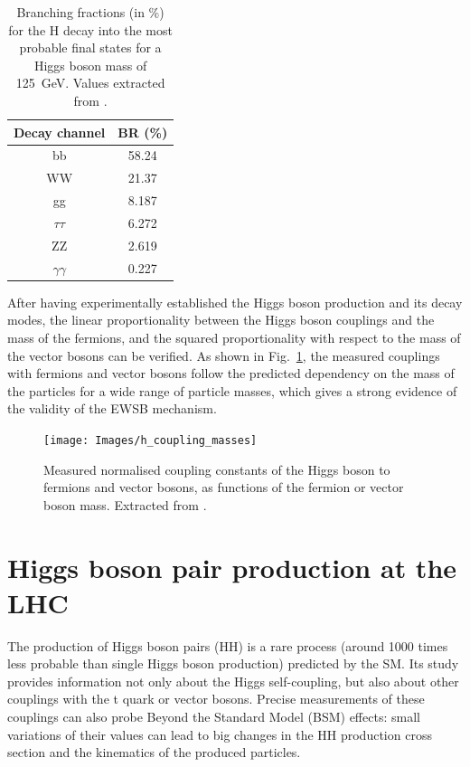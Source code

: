 \documentclass[../main.tex]{subfiles}
\begin{document}
\begin{table}[h!]
\begin{center}
\begin{tabular}{c | c}
Decay channel & BR (\%) \\\hline
bb & 58.24 \\
WW & 21.37 \\
gg & 8.187 \\
$\tau\tau$ & 6.272 \\
ZZ & 2.619 \\
$\gamma\gamma$ & 0.227
\end{tabular}
\caption{Branching fractions (in \%) for the H decay into the most probable final states for a Higgs boson mass of 125~GeV. Values extracted from \cite{intro:theo:yellow_higgs}.}
\label{theo:tab:h_br}
\end{center}
\end{table}

After having experimentally established the Higgs boson production and its decay modes, the linear proportionality between the Higgs boson couplings and the mass of the fermions, and the squared proportionality with respect to the mass of the vector bosons can be verified. As shown in Fig.~\ref{theo:fig:h_coupling_masses}, the measured couplings with fermions and vector bosons follow the predicted dependency on the mass of the particles for a wide range of particle masses, which gives a strong evidence of the validity of the EWSB mechanism.

\begin{figure}[h!]
\begin{center}
\texttt{[image: Images/h\_coupling\_masses]}
\end{center}
\caption{Measured normalised coupling constants of the Higgs boson to fermions and vector bosons, as functions of the fermion or vector boson mass. Extracted from \cite{hh:analysis:nature}.}
\label{theo:fig:h_coupling_masses}
\end{figure}

\section{Higgs boson pair production at the LHC}
\label{theo:sec:hh}

The production of Higgs boson pairs (HH) is a rare process (around 1000 times less probable than single Higgs boson production) predicted by the SM. Its study provides information not only about the Higgs self-coupling, but also about other couplings with the t quark or vector bosons. Precise measurements of these couplings can also probe Beyond the Standard Model (BSM) effects: small variations of their values can lead to big changes in the HH production cross section and the kinematics of the produced particles.
\end{document}
